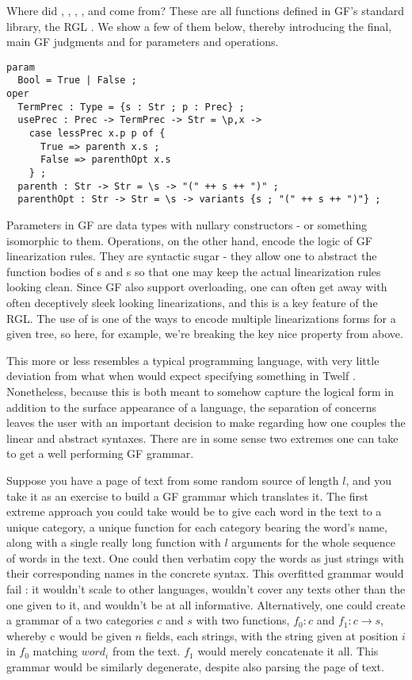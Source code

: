 Where did , , ,
, and  come from? These are all functions
defined in GF's standard library, the RGL \cite{ranta2009rgl}. We show a few of
them below, thereby introducing the final, main GF judgments  and
 for parameters and operations.

\begin{verbatim}
param 
  Bool = True | False ;
oper
  TermPrec : Type = {s : Str ; p : Prec} ;
  usePrec : Prec -> TermPrec -> Str = \p,x ->
    case lessPrec x.p p of {
      True => parenth x.s ;
      False => parenthOpt x.s
    } ;
  parenth : Str -> Str = \s -> "(" ++ s ++ ")" ;
  parenthOpt : Str -> Str = \s -> variants {s ; "(" ++ s ++ ")"} ;
\end{verbatim}

Parameters in GF are data types with nullary constructors - or something
isomorphic to them. Operations, on the other hand, encode the logic of GF
linearization rules. They are syntactic sugar - they allow one to abstract the
function bodies of s and s so that one may keep the
actual linearization rules looking clean. Since GF also support 
overloading, one can often get away with often deceptively sleek looking
linearizations, and this is a key feature of the RGL. The
use of  is one of the ways to encode multiple linearizations
forms for a given tree, so here, for example, we're breaking the key nice
property from above.

This more or less resembles a typical programming language, with very little
deviation from what when would expect specifying something in Twelf
\cite{twelf}. Nonetheless, because this is both meant to somehow capture the
logical form in addition to the surface appearance of a language, the separation
of concerns leaves the user with an important decision to make regarding how one
couples the linear and abstract syntaxes. There are in some sense two extremes
one can take to get a well performing GF grammar.

Suppose you have a page of text from some random source of length $l$, and you
take it as an exercise to build a GF grammar which translates it. The first
extreme approach you could take would be to give each word in the text to a
unique category, a unique function for each category bearing the word's name,
along with a single really long function with $l$ arguments for the whole sequence of
words in the text. One could then verbatim copy the words as just strings with
their corresponding names in the concrete syntax. This overfitted grammar would
fail : it wouldn't scale to other languages, wouldn't cover any texts other than
the one given to it, and wouldn't be at all informative. Alternatively, one
could create a grammar of a two categories $c$ and $s$ with two functions, $f_0
: c$ and $f_1 : c \rightarrow s$, whereby c would be given $n$ fields, each
strings, with the string given at position $i$ in $f_0$ matching $word_i$ from
the text. $f_1$ would merely concatenate it all. This grammar would be similarly
degenerate, despite also parsing the page of text.

